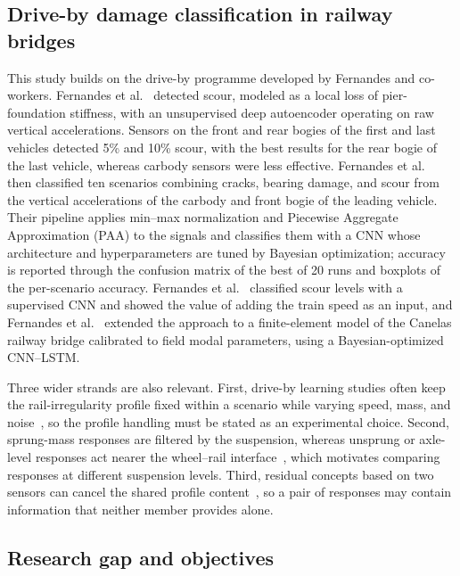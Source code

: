 \subsection{Drive-by damage classification in railway bridges}
\label{sec:related}

This study builds on the drive-by programme developed by Fernandes and
co-workers. Fernandes et al.~\cite{fernandes2024driveby} detected scour,
modeled as a local loss of pier-foundation stiffness, with an unsupervised deep
autoencoder operating on raw vertical accelerations. Sensors on the front and
rear bogies of the first and last vehicles detected 5\% and 10\% scour, with the
best results for the rear bogie of the last vehicle, whereas carbody sensors
were less effective. Fernandes et
al.~\cite{fernandes2025early} then classified ten scenarios combining cracks,
bearing damage, and scour from the vertical accelerations of the carbody and
front bogie of the leading vehicle. Their pipeline applies min--max
normalization and Piecewise Aggregate Approximation (PAA) to the signals and
classifies them with a CNN whose architecture and hyperparameters are tuned by
Bayesian optimization; accuracy is reported through the confusion matrix of the
best of 20 runs and boxplots of the per-scenario accuracy. Fernandes et
al.~\cite{fernandes2026early} classified scour levels with a supervised CNN and
showed the value of adding the train speed as an input, and Fernandes et
al.~\cite{fernandes2026canelas} extended the approach to a finite-element model
of the Canelas railway bridge calibrated to field modal parameters, using a
Bayesian-optimized CNN--LSTM.

Three wider strands are also relevant. First, drive-by learning studies often
keep the rail-irregularity profile fixed within a scenario while varying speed,
mass, and noise~\cite{locke2020using, fernandes2025early}, so the profile
handling must be stated as an experimental choice. Second, sprung-mass
responses are filtered by the suspension, whereas unsprung or axle-level
responses act nearer the wheel--rail interface~\cite{molodova2011axle,
malekjafarian2015review}, which motivates comparing responses at different
suspension levels. Third, residual concepts based on two sensors can cancel the
shared profile content~\cite{keenahan2014use, obrien2015apparent}, so a pair of
responses may contain information that neither member provides alone.

\subsection{Research gap and objectives}
\label{sec:gap}

